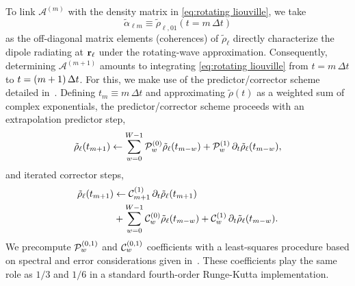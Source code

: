 To link $\mathcal{A}^{(m)}$ with the density matrix in \cref{eq:rotating liouville}, we take
\begin{equation}
  \tilde{\alpha}_{\ell m} \equiv \tilde{\rho}_{\ell, 01}(t = m \, \Delta t)
  \label{eq:polarization definition}
\end{equation}
as the off-diagonal matrix elements (coherences) of $\tilde{\rho}_{\ell}$ directly characterize the dipole radiating at $\vb{r}_\ell$ under the rotating-wave approximation.
Consequently, determining $\mathcal{A}^{(m + 1)}$ amounts to integrating \cref{eq:rotating liouville} from $t = m \, \Delta t$ to $t = \qty(m + 1) \, \Delta t$.
For this, we make use of the predictor/corrector scheme detailed in~\cite{Glaser2009}.
Defining $t_m \equiv m \, \Delta t$ and approximating $\tilde{\rho}(t)$ as a weighted sum of complex exponentials, the predictor/corrector scheme proceeds with an extrapolation predictor step,
\begin{equation}
  \tilde{\rho}_\ell(t_{m + 1}) \leftarrow \sum_{w = 0}^{W-1} \mathcal{P}_w^{\qty(0)} \tilde{\rho}_\ell(t_{m-w}) + \mathcal{P}_w^{\qty(1)} \, \partial_t \tilde{\rho}_\ell(t_{m-w}),
  \label{eq:predictor}
\end{equation}
and iterated corrector steps,
\begin{equation}
  \begin{aligned}
    \tilde{\rho}_\ell(t_{m + 1}) &\leftarrow \mathcal{C}_{m+1}^{\qty(1)} \, \partial_t \tilde{\rho}_\ell(t_{m+1}) \\
                                 &+ \sum_{w = 0}^{W - 1} \mathcal{C}_w^{\qty(0)} \tilde{\rho}_\ell(t_{m-w}) + \mathcal{C}_w^{\qty(1)} \, \partial_t \tilde{\rho}_\ell(t_{m-w}).
  \end{aligned}
  \label{eq:corrector}
\end{equation}
We precompute $\mathcal{P}_w^{\qty(0, 1)}$ and $\mathcal{C}_w^{\qty(0, 1)}$ coefficients with a least-squares procedure based on spectral and error considerations given in~\cite{Glaser2009}. These coefficients play the same role as $1/3$ and $1/6$ in a standard fourth-order Runge-Kutta implementation.

